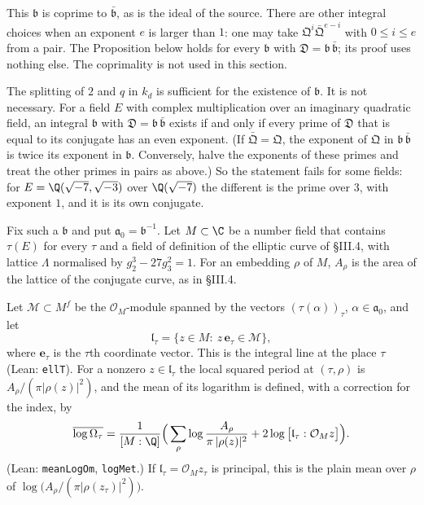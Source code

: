 \documentclass[11pt,letterpaper]{article}
\begin{document}
This $\mathfrak b$ is coprime to $\bar{\mathfrak b}$, as is the ideal of the source. There are other
integral choices when an exponent $e$ is larger than $1$: one may take $\mathfrak Q^{i}\bar{\mathfrak Q}^{e-i}$
with $0\le i\le e$ from a pair. The Proposition below holds for every $\mathfrak b$ with
$\mathfrak D=\mathfrak b\,\bar{\mathfrak b}$; its proof uses nothing else. The coprimality is not used in
this section.

The splitting of $2$ and $q$ in $k_d$ is sufficient for the existence of $\mathfrak b$. It is not
necessary. For a field $E$ with complex multiplication over an imaginary quadratic field, an integral
$\mathfrak b$ with $\mathfrak D=\mathfrak b\,\bar{\mathfrak b}$ exists if and only if every prime of
$\mathfrak D$ that is equal to its conjugate has an even exponent. (If $\bar{\mathfrak Q}=\mathfrak Q$,
the exponent of $\mathfrak Q$ in $\mathfrak b\,\bar{\mathfrak b}$ is twice its exponent in $\mathfrak b$.
Conversely, halve the exponents of these primes and treat the other primes in pairs as above.) So the
statement fails for some fields: for $E=\Q(\sqrt{-7},\sqrt{-3})$ over $\Q(\sqrt{-7})$ the different is the
prime over $3$, with exponent $1$, and it is its own conjugate.

Fix such a $\mathfrak b$ and put $\mathfrak a_0=\mathfrak b^{-1}$. Let $M\subset\C$ be a number field
that contains $\tau(E)$ for every $\tau$ and a field of definition of the elliptic curve of \S III.4,
with lattice $\Lambda$ normalised by $g_2^3-27g_3^2=1$. For an embedding $\rho$ of $M$, $A_\rho$ is the
area of the lattice of the conjugate curve, as in \S III.4.

Let $\mathcal M\subset M^{f}$ be the $\mathcal O_M$-module spanned by the vectors
$(\tau(\alpha))_\tau$, $\alpha\in\mathfrak a_0$, and let
\begin{equation}\label{D:285}
 \mathfrak l_\tau=\{z\in M:\ z\,\mathbf e_\tau\in\mathcal M\},
\end{equation}
where $\mathbf e_\tau$ is the $\tau$th coordinate vector. This is the integral line at the place $\tau$
(Lean: \texttt{ellT}). For a nonzero $z\in\mathfrak l_\tau$ the local squared period at $(\tau,\rho)$ is
$A_\rho/(\pi|\rho(z)|^2)$, and the mean of its logarithm is defined, with a correction for the index, by
\begin{equation}\label{sa:meandef}
 \overline{\log\Omega_\tau}=\frac1{[M:\Q]}\Big(\sum_{\rho}\log\frac{A_\rho}{\pi\,|\rho(z)|^2}
 +2\log\big[\mathfrak l_\tau:\mathcal O_Mz\big]\Big).
\end{equation}
(Lean: \texttt{meanLogOm}, \texttt{logMet}.) If $\mathfrak l_\tau=\mathcal O_Mz_\tau$ is principal, this
is the plain mean over $\rho$ of $\log\big(A_\rho/(\pi|\rho(z_\tau)|^2)\big)$.
\end{document}
